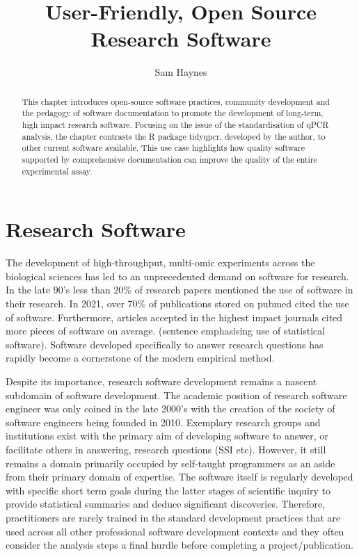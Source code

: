 \documentclass{SBCbookchapter}
\author{Sam Haynes}
\title{User-Friendly, Open Source Research Software}
\begin{document}
\maketitle

\begin{abstract}
This chapter introduces open-source software practices, community development and the pedagogy of software documentation to promote the development of long-term, high impact research software. Focusing on the issue of the standardisation of qPCR analysis, the chapter contrasts the R package tidyqpcr, developed by the author, to other current software available. This use case highlights how quality software supported by comprehensive documentation can improve the quality of the entire experimental assay.


\end{abstract}

\section{Research Software}

The development of high-throughput, multi-omic experiments across the biological sciences has led to an unprecedented demand on software for research. In the late 90's less than 20\% of research papers mentioned the use of software in their research. In 2021, over 70\% of publications stored on pubmed cited the use of software. Furthermore, articles accepted in the highest impact journals cited more pieces of software on average. (sentence emphasising use of statistical software). Software developed specifically to answer research questions has rapidly become a cornerstone of the modern empirical method. \cite{Schindler2022}

Despite its importance, research software development remains a nascent subdomain of software development. The academic position of research software engineer was only coined in the late 2000's \cite{Prause2010} with the creation of the society of software engineers being founded in 2010. Exemplary research groups and institutions exist with the primary aim of developing software to answer, or facilitate others in answering, research questions (SSI etc). However, it still remains a domain primarily occupied by self-taught programmers as an aside from their primary domain of expertise.  The software itself is regularly developed with specific short term goals during the latter stages of scientific inquiry to provide statistical summaries and deduce significant discoveries. Therefore, practitioners are rarely trained in the standard development practices that are used across all other professional software development contexts and they often consider the analysis steps a final hurdle before completing a project/publication.
\end{document}
